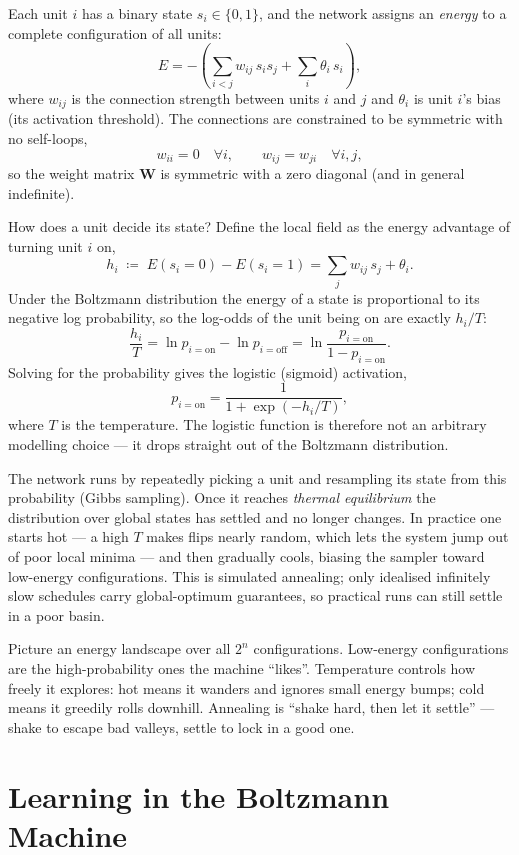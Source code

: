 \documentclass[11pt, oneside]{book}
\newcommand{\eqdef}{\coloneqq}
\begin{document}
Each unit $i$ has a binary state $s_i \in \{0,1\}$, and the network assigns an
\emph{energy} to a complete configuration of all units:
\[
  E = -\left( \sum_{i<j} w_{ij}\, s_i s_j + \sum_i \theta_i\, s_i \right),
\]
where $w_{ij}$ is the connection strength between units $i$ and $j$ and
$\theta_i$ is unit $i$'s bias (its activation threshold). The connections are
constrained to be symmetric with no self-loops,
\[
  w_{ii} = 0 \quad\forall i, \qquad w_{ij} = w_{ji} \quad\forall i,j,
\]
so the weight matrix $\bm{W}$ is symmetric with a zero diagonal (and in general
indefinite).

How does a unit decide its state? Define the local field as the energy advantage of
turning unit $i$ on,
\[
  h_i \;\eqdef\; E(s_i=0)-E(s_i=1) = \sum_j w_{ij}\, s_j + \theta_i .
\]
Under the Boltzmann distribution the energy of a state is proportional to its
negative log probability, so the log-odds of the unit being on are exactly
$h_i / T$:
\[
  \frac{h_i}{T} = \ln p_{i=\text{on}} - \ln p_{i=\text{off}}
   = \ln\!\frac{p_{i=\text{on}}}{1 - p_{i=\text{on}}} .
\]
Solving for the probability gives the logistic (sigmoid) activation,
\[
  p_{i=\text{on}} = \frac{1}{1 + \exp(-h_i / T)} ,
\]
where $T$ is the temperature. The logistic function is therefore not an arbitrary
modelling choice — it drops straight out of the Boltzmann distribution.

The network runs by repeatedly picking a unit and resampling its state from this
probability (Gibbs sampling). Once it reaches \emph{thermal equilibrium} the
distribution over global states has settled and no longer changes. In practice
one starts hot — a high $T$ makes flips nearly random, which lets the system jump
out of poor local minima — and then gradually cools, biasing the sampler toward
low-energy configurations. This is simulated annealing; only idealised infinitely slow
schedules carry global-optimum guarantees, so practical runs can still settle in a poor
basin.

\begin{intbox}
Picture an energy landscape over all $2^n$ configurations. Low-energy
configurations are the high-probability ones the machine ``likes''. Temperature
controls how freely it explores: hot means it wanders and ignores small energy
bumps; cold means it greedily rolls downhill. Annealing is ``shake hard, then let
it settle'' — shake to escape bad valleys, settle to lock in a good one.
\end{intbox}

\section{Learning in the Boltzmann Machine}
\end{document}
